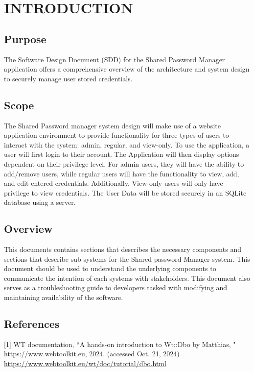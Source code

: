 \documentclass[letterpaper,12pt,oneside,listof=totoc]{scrreprt}
\begin{document}
\chapter{INTRODUCTION}

\section{Purpose}
The Software Design Document (SDD) for the Shared Password Manager application offers a comprehensive overview of the architecture and system design to securely manage user stored credentials. 

\section{Scope}
The Shared Password manager system design will make use of a website application environment to provide functionality for three types of users to interact with the system: admin, regular, and view-only. 
To use the application, a user will first login to their account. The Application will then display options dependent on their privilege level. For admin users, they will have the ability to add/remove users, while regular users will have the functionality to view, add, and edit entered credentials. Additionally, View-only users will only have privilege to view credentials. The User Data will be stored securely in an SQLite database using a server. 

\section{Overview}
This documents contains sections that describes the necessary components and sections that describe sub systems for the Shared password Manager system. This document should be used to understand the underlying components to communicate the intention of each systems with stakeholders. This document also serves as a troubleshooting guide to developers tasked with modifying and maintaining availability of the software.

\section{References}
[1] WT documentation, “A hands-on introduction to Wt::Dbo by Matthias, "
\newline https://www.webtoolkit.eu, 2024. (accessed Oct. 21, 2024) \newline
\url{https://www.webtoolkit.eu/wt/doc/tutorial/dbo.html}\newline
\end{document}
